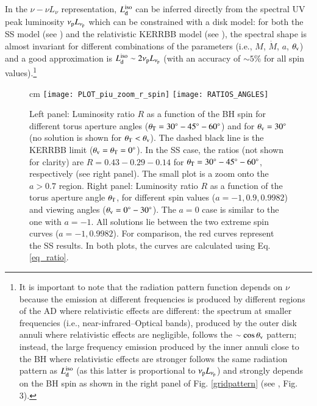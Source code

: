 \documentclass[]{aa}
\begin{document}
In the $\nu - \nu L_{\nu}$ representation, $L^{\rm iso}_{\rm d}$ can be inferred directly from the spectral UV peak luminosity $\nu_{\rm p} L_{\nu_{\rm p}}$ which can be constrained with a disk model: for both the SS model (see \citealt{Caldero}) and the relativistic KERRBB model (see \citealt{Campiti}), the spectral shape is almost invariant for different combinations of the parameters (i.e., $M$, $\dot{M}$, $a$, $\theta_{\rm v}$) and a good approximation is $L^{\rm iso}_{\rm d} \sim 2 \nu_{\rm p} L_{\nu_{\rm p}}$ (with an accuracy of $\sim 5 \%$ for all spin values).\footnote{It is important to note that the radiation pattern function depends on $\nu$ because the emission at different frequencies is produced by different regions of the AD where relativistic effects are different: the spectrum at smaller frequencies (i.e., near-infrared--Optical bands), produced by the outer disk annuli where relativistic effects are negligible, follows the $\sim \cos \theta_{\rm v}$ pattern; instead, the large frequency emission produced by the inner annuli close to the BH where relativistic effects are stronger follows the same radiation pattern as $L^{\rm iso}_{\rm d}$ (as this latter is proportional to $\nu_{\rm p}L_{\nu_{\rm p}}$) and strongly depends on the BH spin as shown in the right panel of Fig. \ref{gridpattern} (see \citealt{Campiti}, Fig. 3).}

\begin{figure*}
\centering
{} cm
\texttt{[image: PLOT\_piu\_zoom\_r\_spin]} \texttt{[image: RATIOS\_ANGLES]}
\caption{Left panel: Luminosity ratio $R$ as a function of the BH spin for different torus aperture angles ($\theta_{\rm T} = 30^{\circ} - 45^{\circ} - 60^{\circ}$) and for $\theta_{\rm v} = 30^{\circ}$ (no solution is shown for $\theta_{\rm T} < \theta_{\rm v}$). The dashed black line is the KERRBB limit ($\theta_{\rm v} = \theta_{\rm T} = 0^{\circ}$). In the SS case, the ratios (not shown for clarity) are $R = 0.43 - 0.29 - 0.14$ for $\theta_{\rm T} = 30^{\circ} - 45^{\circ} - 60^{\circ}$, respectively (see right panel). The small plot is a zoom onto the $a>0.7$ region. Right panel: Luminosity ratio $R$ as a function of the torus aperture angle $\theta_{\rm T}$, for different spin values ($a=-1, 0.9, 0.9982$) and viewing angles ($\theta_{\rm v} = 0^{\circ} - 30^{\circ}$). The $a=0$ case is similar to the one with $a=-1$. All solutions lie between the two extreme spin curves ($a=-1, 0.9982$). For comparison, the red curves represent the SS results. In both plots, the curves are calculated using Eq. \ref{eq_ratio}.} 
\label{gridpattern2}
\end{figure*}
\end{document}
